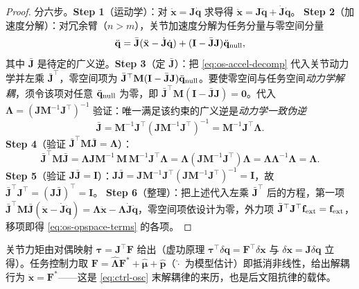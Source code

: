 \begin{proof}
分六步。\textbf{Step 1}（运动学）：对 $\dot{\mathbf x}=\mathbf J\dot{\mathbf q}$ 求导得 $\ddot{\mathbf x}=\mathbf J\ddot{\mathbf q}+\dot{\mathbf J}\dot{\mathbf q}$。
\textbf{Step 2}（加速度分解）：对冗余臂（$n>m$），关节加速度分解为任务分量与零空间分量
\begin{equation}
  \ddot{\mathbf q}=\bar{\mathbf J}(\ddot{\mathbf x}-\dot{\mathbf J}\dot{\mathbf q})+(\mathbf I-\bar{\mathbf J}\mathbf J)\ddot{\mathbf q}_{\rm null},
  \label{eq:os-accel-decomp}
\end{equation}
其中 $\bar{\mathbf J}$ 是待定的广义逆。\textbf{Step 3}（定 $\bar{\mathbf J}$）：把 \cref{eq:os-accel-decomp} 代入关节动力学并左乘 $\bar{\mathbf J}^\top$，零空间项为 $\bar{\mathbf J}^\top\mathbf M(\mathbf I-\bar{\mathbf J}\mathbf J)\ddot{\mathbf q}_{\rm null}$。要使零空间与任务空间\emph{动力学解耦}，须令该项对任意 $\ddot{\mathbf q}_{\rm null}$ 为零，即 $\bar{\mathbf J}^\top\mathbf M(\mathbf I-\bar{\mathbf J}\mathbf J)=\mathbf 0$。代入 $\boldsymbol\Lambda=(\mathbf J\mathbf M^{-1}\mathbf J^\top)^{-1}$ 验证：唯一满足该约束的广义逆是\emph{动力学一致伪逆}
\begin{equation}
  \bar{\mathbf J}=\mathbf M^{-1}\mathbf J^\top(\mathbf J\mathbf M^{-1}\mathbf J^\top)^{-1}=\mathbf M^{-1}\mathbf J^\top\boldsymbol\Lambda.
  \label{eq:os-jbar}
\end{equation}
\textbf{Step 4}（验证 $\bar{\mathbf J}^\top\mathbf M\bar{\mathbf J}=\boldsymbol\Lambda$）：
\[
  \bar{\mathbf J}^\top\mathbf M\bar{\mathbf J}=\boldsymbol\Lambda\mathbf J\mathbf M^{-1}\,\mathbf M\,\mathbf M^{-1}\mathbf J^\top\boldsymbol\Lambda=\boldsymbol\Lambda(\mathbf J\mathbf M^{-1}\mathbf J^\top)\boldsymbol\Lambda=\boldsymbol\Lambda\boldsymbol\Lambda^{-1}\boldsymbol\Lambda=\boldsymbol\Lambda.
\]
\textbf{Step 5}（验证 $\mathbf J\bar{\mathbf J}=\mathbf I$）：$\mathbf J\bar{\mathbf J}=\mathbf J\mathbf M^{-1}\mathbf J^\top(\mathbf J\mathbf M^{-1}\mathbf J^\top)^{-1}=\mathbf I$，故 $\bar{\mathbf J}^\top\mathbf J^\top=(\mathbf J\bar{\mathbf J})^\top=\mathbf I$。
\textbf{Step 6}（整理）：把上述代入左乘 $\bar{\mathbf J}^\top$ 后的方程，第一项 $\bar{\mathbf J}^\top\mathbf M\bar{\mathbf J}(\ddot{\mathbf x}-\dot{\mathbf J}\dot{\mathbf q})=\boldsymbol\Lambda\ddot{\mathbf x}-\boldsymbol\Lambda\dot{\mathbf J}\dot{\mathbf q}$，零空间项依设计为零，外力项 $\bar{\mathbf J}^\top\mathbf J^\top\mathbf f_{\rm ext}=\mathbf f_{\rm ext}$，移项即得 \cref{eq:os-opspace-terms} 的各项。
\end{proof}

\begin{insight}
关节力矩由对偶映射 $\boldsymbol\tau=\mathbf J^\top\mathbf F$ 给出（虚功原理 $\boldsymbol\tau^\top\delta\mathbf q=\mathbf F^\top\delta\mathbf x$ 与 $\delta\mathbf x=\mathbf J\delta\mathbf q$ 立得）。任务控制力取 $\mathbf F=\hat{\boldsymbol\Lambda}\mathbf F^*+\hat{\boldsymbol\mu}+\hat{\mathbf p}$（$\hat{\cdot}$ 为模型估计）即抵消非线性，给出解耦行为 $\ddot{\mathbf x}=\mathbf F^*$——这是 \cref{eq:ctrl-osc} 末解耦律的来历，也是后文阻抗律的载体。
\end{insight}

